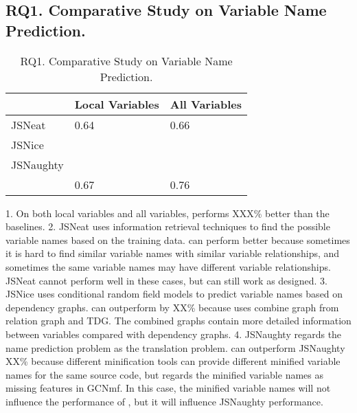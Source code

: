 \subsection{{\bf RQ1. Comparative Study on Variable Name Prediction.}}
\label{empirical-rq1}

\begin{table}[t]
	\caption{RQ1. Comparative Study on Variable Name Prediction.}
	\begin{center}
		\small
		\renewcommand{\arraystretch}{1} 
		\begin{tabular}{p{2cm}<{\centering}|p{2cm}<{\centering}|p{2cm}<{\centering}}
			\hline
		                & Local Variables & All Variables\\
			\hline
			JSNeat      & 0.64            & 0.66    \\
			JSNice      &                 &         \\
			JSNaughty   &                 &         \\
			\hline
			{\tool}     & 0.67            & 0.76    \\
			\hline
		\end{tabular}
		\label{RQ1-result}
	\end{center}
\end{table}

1. On both local variables and all variables, {\tool} performs XXX\% better than the baselines. 
2. JSNeat uses information retrieval techniques to find the possible variable names based on the training data. {\tool} can perform better because sometimes it is hard to find similar variable names with similar variable relationships, and sometimes the same variable names may have different variable relationships. JSNeat cannot perform well in these cases, but {\tool} can still work as designed.
3. JSNice uses conditional random field models to predict variable names based on dependency graphs. {\tool} can outperform {\tool} by XX\% because {\tool} uses combine graph from relation graph and TDG. The combined graphs contain more detailed information between variables compared with dependency graphs. 
4. JSNaughty regards the name prediction problem as the translation problem. {\tool} can outperform JSNaughty XX\% because different minification tools can provide different minified variable names for the same source code, but {\tool} regards the minified variable names as missing features in GCNmf. In this case, the minified variable names will not influence the performance of {\tool}, but it will influence JSNaughty performance. 